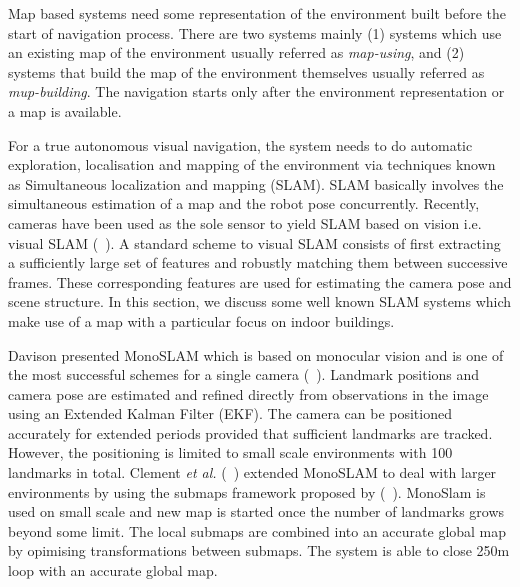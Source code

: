 Map based systems need 
some representation of the environment 
built before the start of navigation process. 
There are two systems mainly 
(1) systems which use an existing 
map of the environment 
usually referred as \emph{map-using}, 
and (2) systems that 
build the map of the environment themselves 
usually 
referred as \emph{mup-building}. 
The navigation starts only 
after the environment representation or a 
map is available.

For a true autonomous visual navigation, the 
system needs to do automatic exploration, 
localisation and mapping of the environment 
via techniques known as Simultaneous localization and mapping (SLAM).
SLAM basically involves the simultaneous 
estimation of a map and the robot pose concurrently.
Recently, cameras have been used as the sole sensor
to yield SLAM based on vision i.e. visual SLAM (~\citet{chen07, davison07,silveira08}).
A standard scheme to visual SLAM consists 
of first extracting a sufficiently
large set of features and robustly matching
them between successive frames. These corresponding features
are used for estimating the camera pose
and scene structure. In this section, 
we discuss some well known SLAM systems 
which make use of a map 
with a particular focus on indoor buildings. 

Davison presented MonoSLAM which 
is based on monocular vision and is one of the most 
successful schemes for a single camera (~\citet{davison03}). 
Landmark positions and camera pose 
are estimated and refined directly from 
observations in the image using an 
Extended Kalman Filter (EKF).
The camera can be positioned accurately 
for extended periods provided that sufficient landmarks 
are tracked. However, the positioning is limited to 
small scale environments with 100 
landmarks in total. Clement \emph{et al.} 
(~\citet{clemente07}) 
extended MonoSLAM to deal with 
larger environments by using 
the submaps framework proposed by (~\citet{estrada05}).
MonoSlam is used on small scale and new map is started 
once the number of landmarks grows beyond
some limit. The local submaps are combined into 
an accurate global map by opimising transformations 
between submaps. The system is able to close 
250m loop with an accurate global map.



